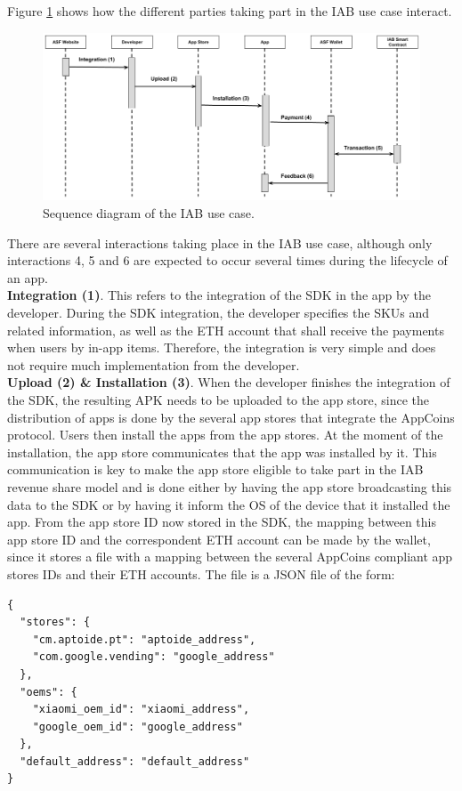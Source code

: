 Figure \ref{fig:iab_sequence_diagram} shows how the different parties taking part in the IAB use case interact.

\begin{figure}[H]
\centering
\includegraphics[width=\textwidth]{diagrams/iab_sequence_diagram.png}
\caption{Sequence diagram of the IAB use case.}
\label{fig:iab_sequence_diagram}
\end{figure}

There are several interactions taking place in the IAB use case, although only interactions \textsf{4}, \textsf{5} and \textsf{6} are expected to occur several times during the lifecycle of an app. \\

\noindent \textbf{Integration (1)}. This refers to the integration of the SDK in the app by the developer. During the SDK integration, the developer specifies the SKUs and related information, as well as the ETH account that shall receive the payments when users by in-app items. Therefore, the integration is very simple and does not require much implementation from the developer. \\

\noindent \textbf{Upload (2) \& Installation (3)}. When the developer finishes the integration of the SDK, the resulting APK needs to be uploaded to the app store, since the distribution of apps is done by the several app stores that integrate the AppCoins protocol. Users then install the apps from the app stores. At the moment of the installation, the app store communicates that the app was installed by it. This communication is key to make the app store eligible to take part in the IAB revenue share model and is done either by having the app store broadcasting this data to the SDK or by having it inform the OS of the device that it installed the app. From the app store ID now stored in the SDK, the mapping between this app store ID and the correspondent ETH account can be made by the wallet, since it stores a file with a mapping between the several AppCoins compliant app stores IDs and their ETH accounts. The file is a JSON file of the form:
\begin{tcolorbox}[enhanced jigsaw,sharp corners, drop fuzzy shadow=ShadowColor]
\begin{lstlisting}
{
  "stores": {
    "cm.aptoide.pt": "aptoide_address",
    "com.google.vending": "google_address"
  },
  "oems": {
    "xiaomi_oem_id": "xiaomi_address",
    "google_oem_id": "google_address"
  },
  "default_address": "default_address"
}
\end{lstlisting}
\end{tcolorbox} 

